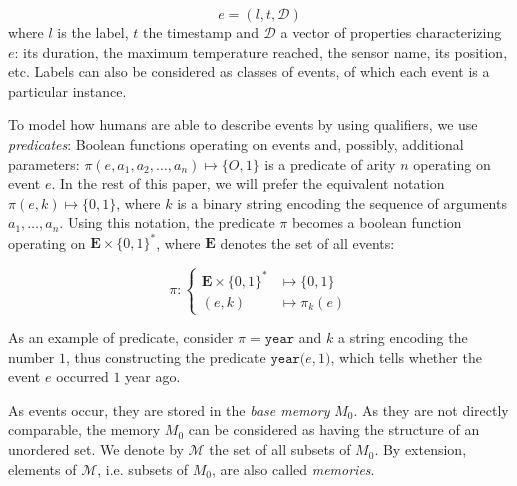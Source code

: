 \documentclass[entropy,article,submit,moreauthors,pdftex]{Definitions/mdpi}
\begin{document}
\begin{equation}
    \label{eq:event}
    e = (l, t,\mathcal{D})
\end{equation}
where $l$ is the label, $t$ the timestamp and $\mathcal{D}$ a vector of properties characterizing $e$: its duration, the maximum temperature reached, the sensor name, its position, etc. Labels can also be considered as classes of events, of which each event is a particular instance.

To model how humans are able to describe events by using qualifiers, we use \emph{predicates}: Boolean functions operating on events and, possibly, additional parameters: $\pi(e, a_1, a_2, \dots, a_n) \mapsto \{O,1\}$ is a predicate of arity $n$ operating on event $e$. In the rest of this paper, we will prefer the equivalent notation $\pi(e, k) \mapsto \{0,1\}$, where $k$ is a binary string encoding the sequence of arguments $a_1, \dots, a_n$. Using this notation, the predicate $\pi$ becomes a boolean function operating on $\mathbf{E} \times \{0,1\}^*$, where $\mathbf{E}$ denotes the set of all events:

\begin{equation}
    \label{eq:predicate}
    \pi : \begin{cases}
        \mathbf{E}\times \{0,1\}^{*} & \mapsto \{0,1\}    \\
        (e, k)                        & \mapsto \pi_{k}(e)
    \end{cases}
\end{equation}

As an example of predicate, consider $\pi = \mathtt{year}$ and $k$ a string encoding the number $1$, thus
constructing the predicate $\mathtt{year(}e, 1\mathtt{)}$, which tells whether
the event $e$ occurred $1$ year ago.

As events occur, they are stored in the  \emph{base memory} $M_0$. As they are not directly comparable, the memory $M_0$ can be considered as having the structure of an unordered set. We denote by $\mathcal{M}$ the set of all subsets of $M_0$. By extension, elements of $\mathcal{M}$, i.e. subsets of $M_0$, are also called \emph{memories}.
\end{document}

